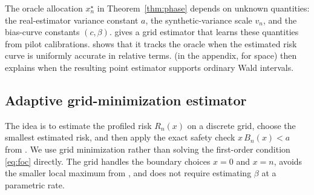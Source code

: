 \label{sec:adaptive}

The oracle allocation $x_n^\star$ in Theorem~\ref{thm:phase} depends on unknown quantities: the real-estimator variance constant $a$, the synthetic-variance scale $v_n$, and the bias-curve constants $(c,\beta)$.  gives a grid estimator that learns these quantities from pilot calibrations.  shows that it tracks the oracle when the estimated risk curve is uniformly accurate in relative terms.  (in the appendix, for space) then explains when the resulting point estimator supports ordinary Wald intervals.

\subsection{Adaptive grid-minimization estimator}\label{ssec:adaptive}

The idea is to estimate the profiled risk $R_n(x)$ on a discrete grid, choose the smallest estimated risk, and then apply the exact safety check $x\,B_n(x)<a$ from . We use grid minimization rather than solving the first-order condition \cref{eq:foc} directly. The grid handles the boundary choices $x=0$ and $x=n$, avoids the smaller local maximum from , and does not require estimating $\beta$ at a parametric rate.


